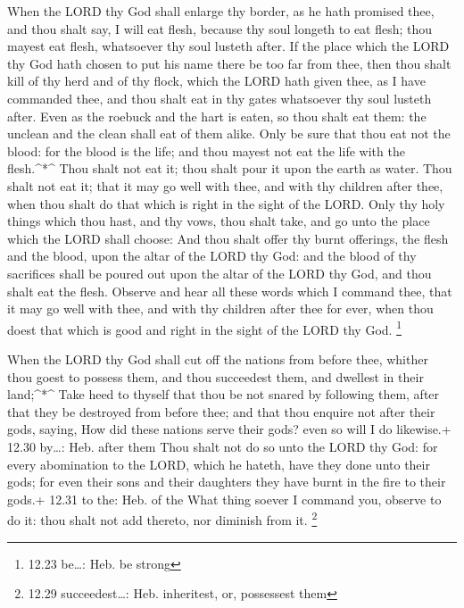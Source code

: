  When the LORD thy God shall enlarge thy border, as he hath
promised thee, and thou shalt say, I will eat flesh, because thy soul
longeth to eat flesh; thou mayest eat flesh, whatsoever thy soul lusteth
after.  If the place which the LORD thy God hath chosen to
put his name there be too far from thee, then thou shalt kill of thy
herd and of thy flock, which the LORD hath given thee, as I have
commanded thee, and thou shalt eat in thy gates whatsoever thy soul
lusteth after.  Even as the roebuck and the hart is eaten,
so thou shalt eat them: the unclean and the clean shall eat of them
alike.  Only be sure that thou eat not the blood: for the
blood is the life; and thou mayest not eat the life with the
flesh.\^{}*\^{}  Thou shalt not eat it; thou shalt pour it
upon the earth as water.  Thou shalt not eat it; that it
may go well with thee, and with thy children after thee, when thou shalt
do that which is right in the sight of the LORD.  Only thy
holy things which thou hast, and thy vows, thou shalt take, and go unto
the place which the LORD shall choose:  And thou shalt
offer thy burnt offerings, the flesh and the blood, upon the altar of
the LORD thy God: and the blood of thy sacrifices shall be poured out
upon the altar of the LORD thy God, and thou shalt eat the flesh.
 Observe and hear all these words which I command thee,
that it may go well with thee, and with thy children after thee for
ever, when thou doest that which is good and right in the sight of the
LORD thy God. \footnote{12.23 be\ldots: Heb. be strong}

 When the LORD thy God shall cut off the nations from
before thee, whither thou goest to possess them, and thou succeedest
them, and dwellest in their land;\^{}*\^{}  Take heed to
thyself that thou be not snared by following them, after that they be
destroyed from before thee; and that thou enquire not after their gods,
saying, How did these nations serve their gods? even so will I do
likewise.+ 12.30 by\ldots: Heb. after them  Thou shalt not
do so unto the LORD thy God: for every abomination to the LORD, which he
hateth, have they done unto their gods; for even their sons and their
daughters they have burnt in the fire to their gods.+ 12.31 to the: Heb.
of the  What thing soever I command you, observe to do it:
thou shalt not add thereto, nor diminish from it. \footnote{12.29
  succeedest\ldots: Heb. inheritest, or, possessest them}

